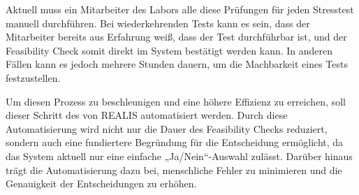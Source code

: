 Aktuell muss ein Mitarbeiter des Labors alle diese Prüfungen für jeden Stresstest manuell durchführen. Bei wiederkehrenden Tests kann es sein, dass der Mitarbeiter bereits aus Erfahrung weiß, dass der Test durchführbar ist, und der Feasibility Check somit direkt im System bestätigt werden kann. In anderen Fällen kann es jedoch mehrere Stunden dauern, um die Machbarkeit eines Tests festzustellen.

Um diesen Prozess zu beschleunigen und eine höhere Effizienz zu erreichen, soll dieser Schritt des  von \gls{REALIS} automatisiert werden. Durch diese Automatisierung wird nicht nur die Dauer des Feasibility Checks reduziert, sondern auch eine fundiertere Begründung für die Entscheidung ermöglicht, da das System aktuell nur eine einfache „Ja/Nein“-Auswahl zulässt. Darüber hinaus trägt die Automatisierung dazu bei, menschliche Fehler zu minimieren und die Genauigkeit der Entscheidungen zu erhöhen.